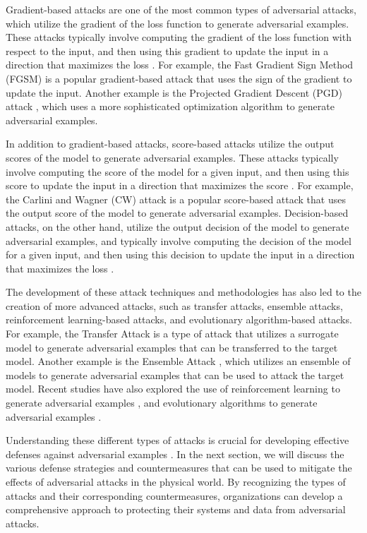 \documentclass[11pt]{article}
\begin{document}
Gradient-based attacks are one of the most common types of adversarial attacks, which utilize the gradient of the loss function to generate adversarial examples. These attacks typically involve computing the gradient of the loss function with respect to the input, and then using this gradient to update the input in a direction that maximizes the loss \cite{ref50}. For example, the Fast Gradient Sign Method (FGSM) \cite{ref51} is a popular gradient-based attack that uses the sign of the gradient to update the input. Another example is the Projected Gradient Descent (PGD) attack \cite{ref52}, which uses a more sophisticated optimization algorithm to generate adversarial examples.

In addition to gradient-based attacks, score-based attacks utilize the output scores of the model to generate adversarial examples. These attacks typically involve computing the score of the model for a given input, and then using this score to update the input in a direction that maximizes the score \cite{ref53}. For example, the Carlini and Wagner (CW) attack \cite{ref51} is a popular score-based attack that uses the output score of the model to generate adversarial examples. Decision-based attacks, on the other hand, utilize the output decision of the model to generate adversarial examples, and typically involve computing the decision of the model for a given input, and then using this decision to update the input in a direction that maximizes the loss \cite{ref53}.

The development of these attack techniques and methodologies has also led to the creation of more advanced attacks, such as transfer attacks, ensemble attacks, reinforcement learning-based attacks, and evolutionary algorithm-based attacks. For example, the Transfer Attack \cite{ref54} is a type of attack that utilizes a surrogate model to generate adversarial examples that can be transferred to the target model. Another example is the Ensemble Attack \cite{ref55}, which utilizes an ensemble of models to generate adversarial examples that can be used to attack the target model. Recent studies have also explored the use of reinforcement learning to generate adversarial examples \cite{ref56}, and evolutionary algorithms to generate adversarial examples \cite{ref57}.

Understanding these different types of attacks is crucial for developing effective defenses against adversarial examples \cite{ref58}. In the next section, we will discuss the various defense strategies and countermeasures that can be used to mitigate the effects of adversarial attacks in the physical world. By recognizing the types of attacks and their corresponding countermeasures, organizations can develop a comprehensive approach to protecting their systems and data from adversarial attacks.
\end{document}
